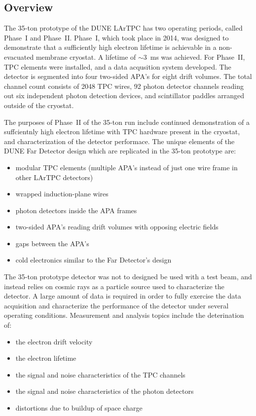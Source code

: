 \label{sec:35t}
\subsection{Overview}
The 35-ton prototype of the DUNE LArTPC has two operating periods, called Phase~I and Phase~II.  Phase~I, which took place
in 2014, was designed to demonstrate that a sufficiently high electron lifetime is achievable in a non-evacuated
membrane cryostat. A lifetime of $\sim$3~ms was achieved.  For Phase~II, TPC elements were installed, and
a data acqusition system developed.  The detector is segmented into four two-sided APA's for eight drift volumes.
The total channel count consists of 2048 TPC wires, 92 photon detector channels reading out six independent photon
detection devices, and scintillator paddles arranged outside of the cryostat.

The purposes of Phase~II of the 35-ton run include continued demonstration of a suffcientnly high electron
lifetime with TPC hardware present in the cryostat, and characterization of the detector performace.
The unique elements of the DUNE Far Detector design which are replicated in the 35-ton
prototype are:
\begin{itemize}
\item  modular TPC elements (multiple APA's instead of just one wire frame in other LArTPC 
detectors)
\item wrapped induction-plane wires
\item photon detectors inside the APA frames
\item two-sided APA's reading drift volumes with opposing electric fields
\item gaps between the APA's
\item cold electronics similar to the Far Detector's design
\end{itemize}

\noindent
The 35-ton prototype detector was not to designed be used with a test beam, and instead relies on cosmic rays as
a particle source used to characterize the detector.  A large amount
of data is required in order to fully exercise the data acquisition and characterize the 
performance of the detector under several operating conditions.  Measurement and analysis topics include
the deterination of:
\begin{itemize}
\item the electron drift velocity
\item the electron lifetime
\item the signal and noise characteristics of the TPC channels
\item the signal and noise characteristics of the photon detectors
\item distortions due to buildup of space charge
\end{itemize}

